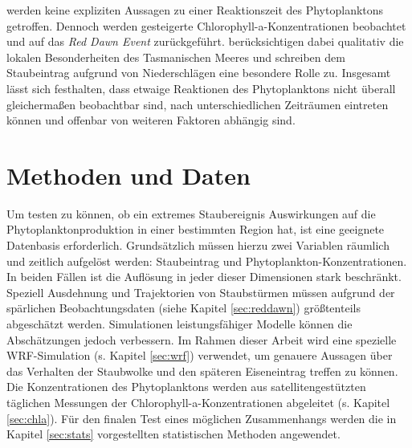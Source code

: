 \documentclass[12pt,a4paper,onecolumn]{scrartcl}
\begin{document}
werden keine expliziten Aussagen zu einer Reaktionszeit des Phytoplanktons getroffen. Dennoch werden gesteigerte Chlorophyll-a-Konzentrationen beobachtet und auf das \textit{Red Dawn Event} zurückgeführt. \citet{Gabric.2016} berücksichtigen dabei qualitativ die lokalen Besonderheiten des Tasmanischen Meeres und schreiben dem Staubeintrag aufgrund von Niederschlägen eine besondere Rolle zu. Insgesamt lässt sich festhalten, dass etwaige Reaktionen des Phytoplanktons nicht überall gleichermaßen beobachtbar sind, nach unterschiedlichen Zeiträumen eintreten können und offenbar von  weiteren Faktoren abhängig sind. 
\section{Methoden und Daten} \label{sec:Methoden}
Um testen zu können, ob ein extremes Staubereignis Auswirkungen auf die Phytoplanktonproduktion in einer bestimmten Region hat, ist eine geeignete Datenbasis erforderlich. Grundsätzlich müssen hierzu zwei Variablen räumlich und zeitlich aufgelöst werden: Staubeintrag und Phytoplankton-Konzentrationen. In beiden Fällen ist die Auflösung in jeder dieser Dimensionen stark beschränkt. Speziell Ausdehnung und Trajektorien von Staubstürmen müssen aufgrund der spärlichen Beobachtungsdaten (siehe Kapitel  \ref{sec:reddawn}) größtenteils abgeschätzt werden. Simulationen leistungsfähiger Modelle können die Abschätzungen jedoch verbessern. Im Rahmen dieser Arbeit wird eine spezielle WRF-Simulation (s. Kapitel \ref{sec:wrf}) verwendet, um genauere Aussagen über das Verhalten der Staubwolke und den späteren Eiseneintrag treffen zu können. Die Konzentrationen des Phytoplanktons werden aus satellitengestützten täglichen Messungen der Chlorophyll-a-Konzentrationen abgeleitet (s. Kapitel \ref{sec:chla}). Für den finalen Test eines möglichen Zusammenhangs werden die in Kapitel \ref{sec:stats} vorgestellten statistischen Methoden angewendet.
\end{document}
